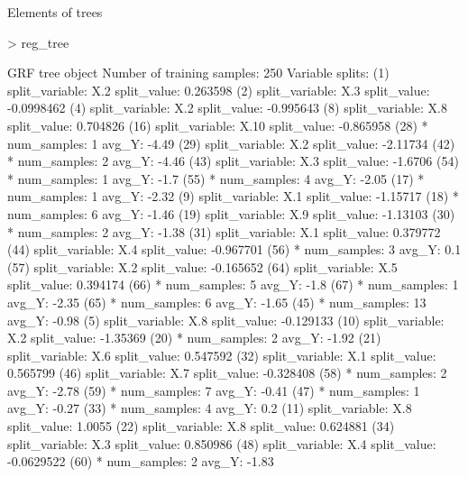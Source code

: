 \documentclass[xcolor={table}, handout]{beamer}
\begin{document}
\begin{frame}[fragile]{Elements of trees}
\small
\begin{Schunk}
\begin{Sinput}
> reg_tree
\end{Sinput}
\begin{Soutput}
GRF tree object 
Number of training samples: 250 
Variable splits: 
(1) split_variable: X.2  split_value: 0.263598 
  (2) split_variable: X.3  split_value: -0.0998462 
    (4) split_variable: X.2  split_value: -0.995643 
      (8) split_variable: X.8  split_value: 0.704826 
        (16) split_variable: X.10  split_value: -0.865958 
          (28) * num_samples: 1  avg_Y: -4.49 
          (29) split_variable: X.2  split_value: -2.11734 
            (42) * num_samples: 2  avg_Y: -4.46 
            (43) split_variable: X.3  split_value: -1.6706 
              (54) * num_samples: 1  avg_Y: -1.7 
              (55) * num_samples: 4  avg_Y: -2.05 
        (17) * num_samples: 1  avg_Y: -2.32 
      (9) split_variable: X.1  split_value: -1.15717 
        (18) * num_samples: 6  avg_Y: -1.46 
        (19) split_variable: X.9  split_value: -1.13103 
          (30) * num_samples: 2  avg_Y: -1.38 
          (31) split_variable: X.1  split_value: 0.379772 
            (44) split_variable: X.4  split_value: -0.967701 
              (56) * num_samples: 3  avg_Y: 0.1 
              (57) split_variable: X.2  split_value: -0.165652 
                (64) split_variable: X.5  split_value: 0.394174 
                  (66) * num_samples: 5  avg_Y: -1.8 
                  (67) * num_samples: 1  avg_Y: -2.35 
                (65) * num_samples: 6  avg_Y: -1.65 
            (45) * num_samples: 13  avg_Y: -0.98 
    (5) split_variable: X.8  split_value: -0.129133 
      (10) split_variable: X.2  split_value: -1.35369 
        (20) * num_samples: 2  avg_Y: -1.92 
        (21) split_variable: X.6  split_value: 0.547592 
          (32) split_variable: X.1  split_value: 0.565799 
            (46) split_variable: X.7  split_value: -0.328408 
              (58) * num_samples: 2  avg_Y: -2.78 
              (59) * num_samples: 7  avg_Y: -0.41 
            (47) * num_samples: 1  avg_Y: -0.27 
          (33) * num_samples: 4  avg_Y: 0.2 
      (11) split_variable: X.8  split_value: 1.0055 
        (22) split_variable: X.8  split_value: 0.624881 
          (34) split_variable: X.3  split_value: 0.850986 
            (48) split_variable: X.4  split_value: -0.0629522 
              (60) * num_samples: 2  avg_Y: -1.83 

\end{Soutput}
\end{Schunk}
\end{frame}
\end{document}
